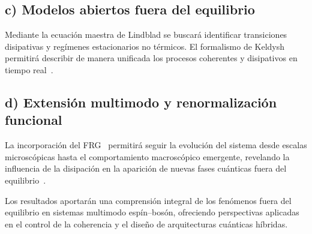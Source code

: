 \documentclass[onecolumn,notitlepage,letterpaper,aps,pra,12pt]{article}
\numberwithin{equation}{section}
\begin{document}
\subsection*{c) Modelos abiertos fuera del equilibrio}
Mediante la ecuación maestra de Lindblad se buscará identificar transiciones disipativas y regímenes estacionarios no térmicos. El formalismo de Keldysh permitirá describir de manera unificada los procesos coherentes y disipativos en tiempo real~\cite{kamenev2023}.

\subsection*{d) Extensión multimodo y renormalización funcional}
La incorporación del FRG~\cite{wetterich1993} permitirá seguir la evolución del sistema desde escalas microscópicas hasta el comportamiento macroscópico emergente, revelando la influencia de la disipación en la aparición de nuevas fases cuánticas fuera del equilibrio~\cite{angelakis2007}.


Los resultados aportarán una comprensión integral de los fenómenos fuera del equilibrio en sistemas multimodo espín–bosón, ofreciendo perspectivas aplicadas en el control de la coherencia y el diseño de arquitecturas cuánticas híbridas.
\end{document}
